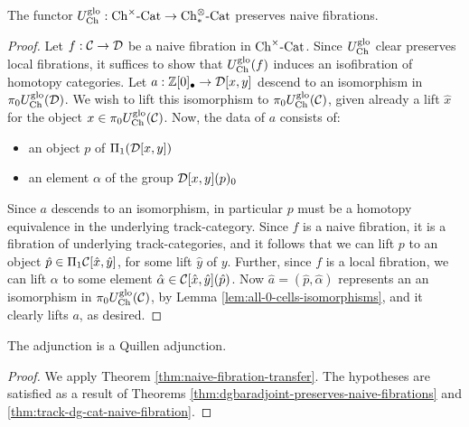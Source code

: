 \documentclass[12pt]{amsart}
\begin{document}
\begin{theorem}\label{thm:dgbaradjoint-preserves-naive-fibrations}
	The functor ${U^{\mathrm{glo}}_\mathrm{Ch}}: {{{\mathrm{Ch}}}^{\times}\text{-}\mathrm{Cat}} \to {\mathrm{Ch}_{*}^{\otimes}\text{-}\mathrm{Cat}}$ preserves naive fibrations.
\end{theorem}
\begin{proof}
	Let $f: \mathcal{C} \to \mathcal{D}$ be a naive fibration in ${{{\mathrm{Ch}}}^{\times}\text{-}\mathrm{Cat}}$. Since ${U^{\mathrm{glo}}_\mathrm{Ch}}$ clear preserves local fibrations, it suffices to show that ${U^{\mathrm{glo}}_\mathrm{Ch}}(f)$ induces an isofibration of homotopy categories. 
	Let $a: \mathbb{Z}[0]_\bullet \to \mathcal{D}[x,y]$ descend to an isomorphism in $\pi_0 {U^{\mathrm{glo}}_\mathrm{Ch}}(\mathcal{D})$. 
	We wish to lift this isomorphism to $\pi_0{U^{\mathrm{glo}}_\mathrm{Ch}}(\mathcal{C})$, given already a lift $\widehat{x}$ for the object $x \in \pi_0 {U^{\mathrm{glo}}_\mathrm{Ch}}(\mathcal{C})$.
	Now, the data of $a$ consists of:
	\begin{itemize}
		\item an object $p$ of $\Pi_1(\mathcal{D}[x,y])$
		\item an element $\alpha$ of the group $\mathcal{D}[x,y](p)_0$
	\end{itemize}
	Since $a$ descends to an isomorphism, in particular $p$ must be a homotopy equivalence in the underlying track-category. 
	Since $f$ is a naive fibration, it is a fibration of underlying track-categories, and it follows that we can lift $p$ to an object $\hat{p} \in \Pi_1\mathcal{C}[\hat{x},\hat{y}]$, for some lift $\hat{y}$ of $y$.
	Further,
	since $f$ is a local fibration, we can lift $\alpha$ to some element $\hat{\alpha} \in \mathcal{C}[\hat{x}, \hat{y}](\hat{p})$. Now $\hat{a} = (\hat{p}, \hat{\alpha})$ represents an an isomorphism in $\pi_0{U^{\mathrm{glo}}_\mathrm{Ch}}(\mathcal{C})$, by Lemma \ref{lem:all-0-cells-isomorphisms}, and it clearly lifts $a$, as desired. 
\end{proof}

	
\begin{theorem}\label{thm:dg-bar-construction-is-quillen}
	The adjunction
	\adjunctiondiagram{\dgbarconstruction}{\trackdgcataug}{\trackchaincat}{\dgbaradjoint}
	is a Quillen adjunction.
\end{theorem}
\begin{proof}
	We apply Theorem \ref{thm:naive-fibration-transfer}. 
	The hypotheses are satisfied as a result of Theorems \ref{thm:dgbaradjoint-preserves-naive-fibrations} and \ref{thm:track-dg-cat-naive-fibration}.
\end{proof}
\end{document}
